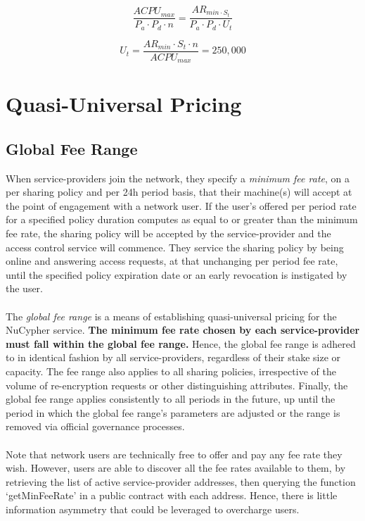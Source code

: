 \documentclass[longbibliography,nofootinbib]{revtex4-1}
\begin{document}
\begin{equation}
     \frac{ACPU_{max}}{P_a \cdot P_d \cdot n} = \frac{AR_{min \cdot S_t}}{P_a \cdot P_d \cdot U_t}
\end{equation}

\begin{equation}
     U_t = \frac{AR_{min} \cdot S_t \cdot n}{ACPU_{max}} = 250,000 
\end{equation}

\section{Quasi-Universal Pricing}

\subsection{Global Fee Range}

When service-providers join the network, they specify a \textit{minimum fee rate}, on a per sharing policy and per 24h period basis, that their machine(s) will accept at the point of engagement with a network user. If the user’s offered per period rate for a specified policy duration computes as equal to or greater than the minimum fee rate, the sharing policy will be accepted by the service-provider and the access control service will commence. They service the sharing policy by being online and answering access requests, at that unchanging per period fee rate, until the specified policy expiration date or an early revocation is instigated by the user.
\\\\
The \textit{global fee range} is a means of establishing quasi-universal pricing for the NuCypher service. \textbf{The minimum fee rate chosen by each service-provider must fall within the global fee range.} Hence, the global fee range is adhered to in identical fashion by all service-providers, regardless of their stake size or capacity. The fee range also applies to all sharing policies, irrespective of the volume of re-encryption requests or other distinguishing attributes. Finally, the global fee range applies consistently to all periods in the future, up until the period in which the global fee range’s parameters are adjusted or the range is removed via official governance processes. 
\\\\
Note that network users are technically free to offer and pay any fee rate they wish. However, users are able to discover all the fee rates available to them, by retrieving the list of active service-provider addresses, then querying the function `getMinFeeRate' in a public contract with each address. Hence, there is little information asymmetry that could be leveraged to overcharge users.  
\end{document}
